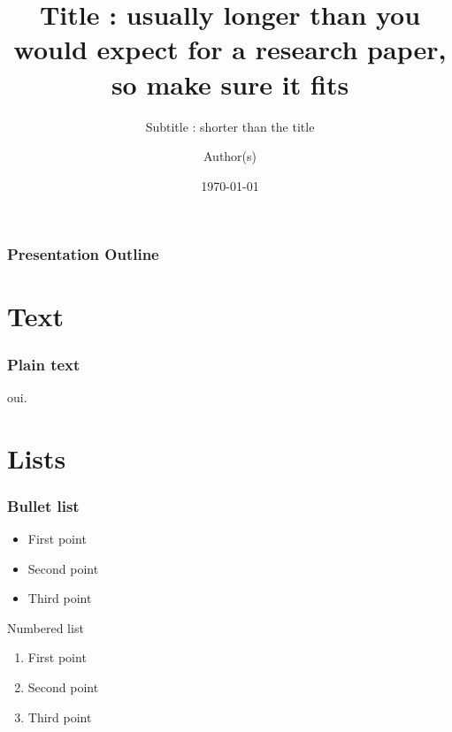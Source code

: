 \documentclass[
	11pt, %
	aspectratio=169, %
]{beamer}
\title{Title : usually longer than you would expect for a research paper, so make sure it fits}
\subtitle{Subtitle : shorter than the title}
\author{Author(s)}
\institute{ARAMIS Lab}
\date{\today}
\begin{document}

\begin{frame}
	\titlepage %
\end{frame}


\begin{frame}
	\frametitle{Presentation Outline} %
	\tableofcontents %
\end{frame}


\section{Text}

\begin{frame}
  \frametitle{Plain text}

  \lipsum[1][1-5]
  \vfill
  \lipsum[2][1-5]
  \vfill
  \lipsum[3][1-5] oui.

\end{frame}

\section{Lists}

\begin{frame}
  \frametitle{Bullet list}

  \begin{itemize}
    \item First point
    \item Second point
    \item Third point
  \end{itemize} 

\end{frame}

\begin{frame}{Numbered list}
  \begin{enumerate}
    \item First point
    \item Second point
    \item Third point
  \end{enumerate}

\end{frame}
\end{document}

